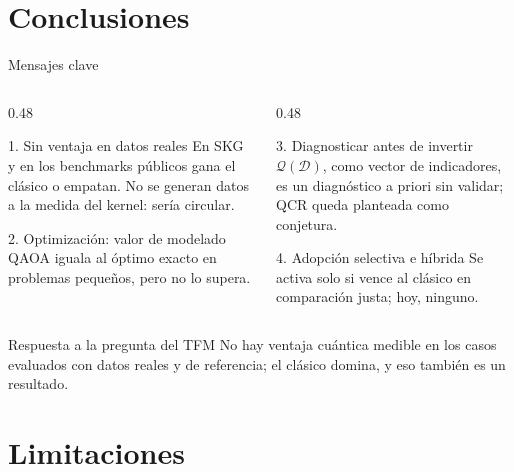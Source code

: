 \documentclass[aspectratio=169,10pt,professionalfonts]{beamer}
\begin{document}
\section{Conclusiones}
\begin{frame}{Mensajes clave}
\begin{columns}[T]
\begin{column}{0.48\textwidth}
\begin{block}{1. Sin ventaja en datos reales}
En SKG y en los benchmarks públicos gana el clásico o empatan. No se generan datos a la medida del kernel: sería circular.
\end{block}
\begin{block}{2. Optimización: valor de modelado}
QAOA iguala al óptimo exacto en problemas pequeños, pero no lo supera.
\end{block}
\end{column}
\begin{column}{0.48\textwidth}
\begin{block}{3. Diagnosticar antes de invertir}
$\mathcal{Q}(\mathcal{D})$, como vector de indicadores, es un diagnóstico a priori sin validar; QCR queda planteada como conjetura.
\end{block}
\begin{block}{4. Adopción selectiva e híbrida}
Se activa solo si vence al clásico en comparación justa; hoy, ninguno.
\end{block}
\end{column}
\end{columns}
\vspace{0.3em}
\begin{alertblock}{Respuesta a la pregunta del TFM}
No hay ventaja cuántica medible en los casos evaluados con datos reales y de referencia; el clásico domina, y eso también es un resultado.
\end{alertblock}
\end{frame}

\section{Limitaciones}
\end{document}
